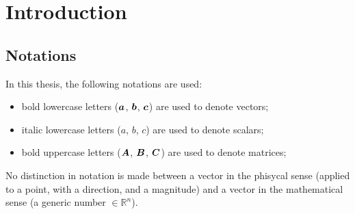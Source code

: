 \chapter{Introduction}
\label{ch:introduction}
\section{Notations}
\label{sec:notations}
In this thesis, the following notations are used:
\begin{itemize}
  \item bold lowercase letters ($\bm{a}$, $\bm{b}$, $\bm{c}$) are used to denote vectors;
  \item italic lowercase letters ($a$, $b$, $c$) are used to denote scalars;
  \item bold uppercase letters ($\bm{A}$, $\bm{B}$, $\bm{C}$) are used to denote matrices;
\end{itemize}

No distinction in notation is made between a vector in the phisycal sense (applied to a point, with a direction, and a magnitude) and a vector in the mathematical sense (a generic number $\in \mathbb{R}^n $).


%  

%  

%  



%   

